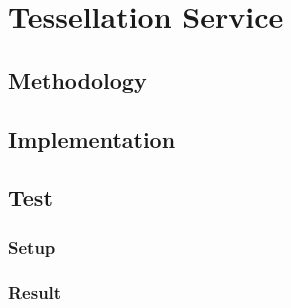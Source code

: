 \chapter{Tessellation Service}

\section{Methodology}
\section{Implementation}
\section{Test}
\subsection{Setup}
\subsection{Result}